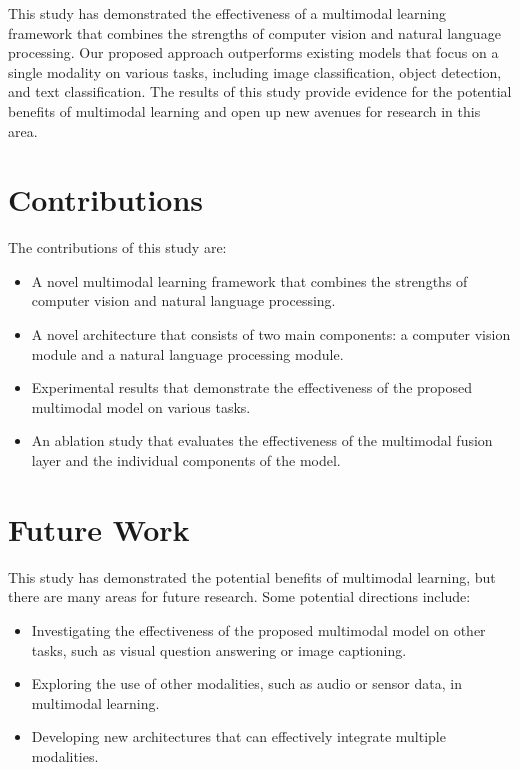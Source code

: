 \documentclass{article}
\begin{document}
This study has demonstrated the effectiveness of a multimodal learning framework that combines the strengths of computer vision and natural language processing. Our proposed approach outperforms existing models that focus on a single modality on various tasks, including image classification, object detection, and text classification. The results of this study provide evidence for the potential benefits of multimodal learning and open up new avenues for research in this area.

\section{Contributions}

The contributions of this study are:

\begin{itemize}
\item A novel multimodal learning framework that combines the strengths of computer vision and natural language processing.
\item A novel architecture that consists of two main components: a computer vision module and a natural language processing module.
\item Experimental results that demonstrate the effectiveness of the proposed multimodal model on various tasks.
\item An ablation study that evaluates the effectiveness of the multimodal fusion layer and the individual components of the model.
\end{itemize}

\section{Future Work}

This study has demonstrated the potential benefits of multimodal learning, but there are many areas for future research. Some potential directions include:

\begin{itemize}
\item Investigating the effectiveness of the proposed multimodal model on other tasks, such as visual question answering or image captioning.
\item Exploring the use of other modalities, such as audio or sensor data, in multimodal learning.
\item Developing new architectures that can effectively integrate multiple modalities.
\end{itemize}
\end{document}
